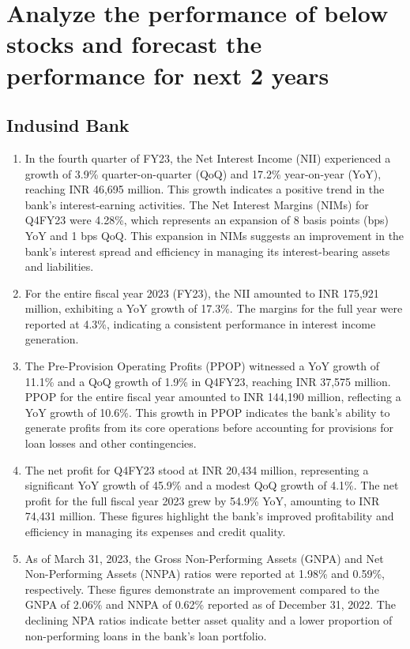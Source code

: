 \section{Analyze the performance of below stocks and forecast the performance for next 2 years}
\subsection{Indusind Bank}
\begin{enumerate}
    \item In the fourth quarter of FY23, the Net Interest Income (NII) experienced a growth of 3.9\% quarter-on-quarter (QoQ) and 17.2\% year-on-year (YoY), reaching INR 46,695 million. This growth indicates a positive trend in the bank's interest-earning activities. The Net Interest Margins (NIMs) for Q4FY23 were 4.28\%, which represents an expansion of 8 basis points (bps) YoY and 1 bps QoQ. This expansion in NIMs suggests an improvement in the bank's interest spread and efficiency in managing its interest-bearing assets and liabilities.

\item For the entire fiscal year 2023 (FY23), the NII amounted to INR 175,921 million, exhibiting a YoY growth of 17.3\%. The margins for the full year were reported at 4.3\%, indicating a consistent performance in interest income generation.

\item The Pre-Provision Operating Profits (PPOP) witnessed a YoY growth of 11.1\% and a QoQ growth of 1.9\% in Q4FY23, reaching INR 37,575 million. PPOP for the entire fiscal year amounted to INR 144,190 million, reflecting a YoY growth of 10.6\%. This growth in PPOP indicates the bank's ability to generate profits from its core operations before accounting for provisions for loan losses and other contingencies.

\item The net profit for Q4FY23 stood at INR 20,434 million, representing a significant YoY growth of 45.9\% and a modest QoQ growth of 4.1\%. The net profit for the full fiscal year 2023 grew by 54.9\% YoY, amounting to INR 74,431 million. These figures highlight the bank's improved profitability and efficiency in managing its expenses and credit quality.

\item As of March 31, 2023, the Gross Non-Performing Assets (GNPA) and Net Non-Performing Assets (NNPA) ratios were reported at 1.98\% and 0.59\%, respectively. These figures demonstrate an improvement compared to the GNPA of 2.06\% and NNPA of 0.62\% reported as of December 31, 2022. The declining NPA ratios indicate better asset quality and a lower proportion of non-performing loans in the bank's loan portfolio.


\end{enumerate}
